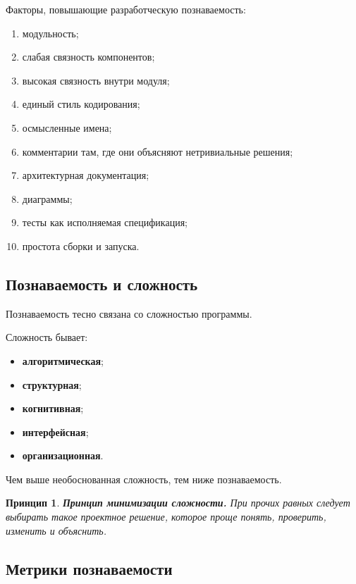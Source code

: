 \documentclass[12pt,a4paper]{article}
\newtheorem{principle}{Принцип}
\begin{document}
Факторы, повышающие разработческую познаваемость:
\begin{enumerate}
    \item модульность;
    \item слабая связность компонентов;
    \item высокая связность внутри модуля;
    \item единый стиль кодирования;
    \item осмысленные имена;
    \item комментарии там, где они объясняют нетривиальные решения;
    \item архитектурная документация;
    \item диаграммы;
    \item тесты как исполняемая спецификация;
    \item простота сборки и запуска.
\end{enumerate}

\subsection{Познаваемость и сложность}

Познаваемость тесно связана со сложностью программы.

Сложность бывает:
\begin{itemize}
    \item \textbf{алгоритмическая};
    \item \textbf{структурная};
    \item \textbf{когнитивная};
    \item \textbf{интерфейсная};
    \item \textbf{организационная}.
\end{itemize}

Чем выше необоснованная сложность, тем ниже познаваемость.

\begin{principle}
\textbf{Принцип минимизации сложности.}
При прочих равных следует выбирать такое проектное решение, которое проще понять, проверить, изменить и объяснить.
\end{principle}

\subsection{Метрики познаваемости}
\end{document}
